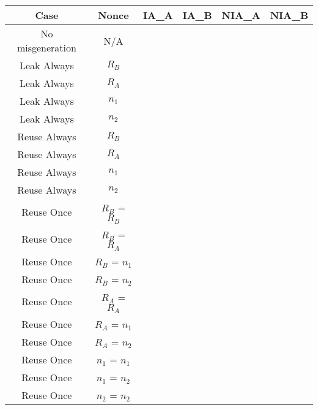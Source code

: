 \documentclass[crop]{standalone}
\newcommand{\noattack}{\color{ForestGreen}\usym{2713}\color{black}}
\newcommand{\attack}{\color{red}\usym{2717}\color{black}}
\begin{document}
\parbox{15cm}{
\begin{tabular}{|c|c|c|c|c|c|}
\hline
Case & Nonce & IA\_A & IA\_B & NIA\_A & NIA\_B \\ \hline
No misgeneration & N/A & \noattack & \noattack & \noattack & \noattack\\ \hline
Leak Always & $R_B$ & \noattack & \noattack & \noattack & \noattack\\ \hline
Leak Always & $R_A$ & \noattack & \noattack & \noattack & \noattack\\ \hline
Leak Always & $n_1$ & \attack & \attack & \attack & \attack\\ \hline
Leak Always & $n_2$ & \attack & \attack & \attack & \attack\\ \hline
Reuse Always & $R_B$ & \noattack & \attack & \noattack & \noattack\\ \hline
Reuse Always & $R_A$ & \attack & \noattack & \noattack & \noattack\\ \hline
Reuse Always & $n_1$ & \attack & \attack & \attack & \attack\\ \hline
Reuse Always & $n_2$ & \attack & \attack & \attack & \attack\\ \hline
Reuse Once & $R_B$ = $R_B$ & \noattack & \attack & \noattack & \noattack\\ \hline
Reuse Once & $R_B$ = $R_A$ & \noattack & \noattack & \noattack & \noattack\\ \hline
Reuse Once & $R_B$ = $n_1$ & \attack & \attack & \attack & \attack\\ \hline
Reuse Once & $R_B$ = $n_2$ & \attack & \attack & \attack & \attack\\ \hline
Reuse Once & $R_A$ = $R_A$ & \attack & \noattack & \noattack & \noattack\\ \hline
Reuse Once & $R_A$ = $n_1$ & \attack & \attack & \attack & \attack\\ \hline
Reuse Once & $R_A$ = $n_2$ & \attack & \attack & \attack & \attack\\ \hline
Reuse Once & $n_1$ = $n_1$ & \attack & \attack & \attack & \attack\\ \hline
Reuse Once & $n_1$ = $n_2$ & \attack & \attack & \attack & \attack\\ \hline
Reuse Once & $n_2$ = $n_2$ & \attack & \attack & \attack & \attack\\ \hline
\end{tabular}}
\end{document}
